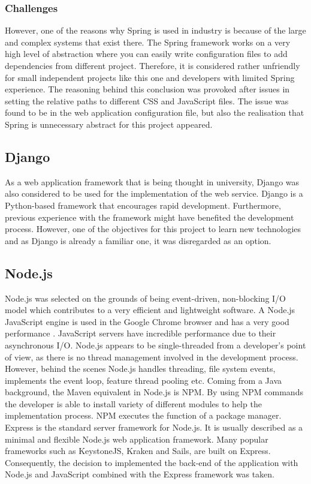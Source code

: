 \documentclass{l4proj}
\begin{document}
\subsubsection{Challenges}

However, one of the reasons why Spring is used in industry is because of the large and complex systems that exist there. The Spring framework works on a very high level of abstraction where you can easily write configuration files to add dependencies from different project. Therefore, it is considered rather unfriendly for small independent projects like this one and developers with limited Spring experience. The reasoning behind this conclusion was provoked after issues in setting the relative paths to different CSS and JavaScript files. The issue was found to be in the web application configuration file, but also the realisation that Spring is unnecessary abstract for this project appeared.

\subsection{Django}

As a web application framework that is being thought in university, Django was also considered to be used for the implementation of the web service. Django is a Python-based framework that encourages rapid development. Furthermore, previous experience with the framework might have benefited the development process. However, one of the objectives for this project to learn new technologies and as Django is already a familiar one, it was disregarded as an option.

\subsection{Node.js}

Node.js was selected on the grounds of being event-driven, non-blocking I/O model which contributes to a very efficient and lightweight software. A Node.js JavaScript engine is used in the Google Chrome browser and has a very good performance \cite{tilkov2010node}. JavaScript servers have incredible performance due to their asynchronous I/O. Node.js appears to be single-threaded from a developer's point of view, as there is no thread management involved in the development process. However, behind the scenes Node.js handles threading, file system events, implements the event loop, feature thread pooling etc. Coming from a Java background, the Maven equivalent in Node.js is NPM. By using NPM commands the developer is able to install variety of different modules to help the implementation process. NPM executes the function of a package manager. Express is the standard server framework for Node.js. It is usually described as a minimal and flexible Node.js web application framework. Many popular frameworks such as KeystoneJS, Kraken and Sails, are built on Express. Consequently, the decision to implemented the back-end of the application with Node.js and JavaScript combined with the Express framework was taken.
\end{document}
